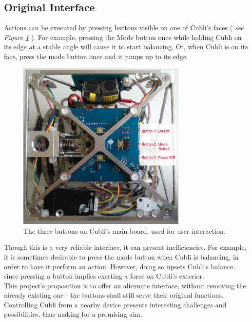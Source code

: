 \subsection{Original Interface}
 
Actions can be executed by pressing buttons visible on one of Cubli's faces ( \textit{see Figure \ref{img:Buttons}} ). For example, pressing the Mode button once while holding Cubli on its edge at a stable angle will cause it to start balancing. Or, when Cubli is on its face, press the mode button once and it jumps up to its edge.\\

\begin{figure}[ht]
   \centering
   \includegraphics[width=0.75\textwidth]{img/Buttons.jpg}
   \caption{The three buttons on Cubli's main board, used for user interaction.}
   \label{img:Buttons}
\end{figure}

Though this is a very reliable interface, it can present inefficiencies. For example, it is sometimes desirable to press the mode button when Cubli is balancing, in order to have it perform an action. However, doing so upsets Cubli's balance, since pressing a button implies exerting a force on Cubli's exterior.\\

This project's proposition is to offer an alternate interface, without removing the already existing one - the buttons shall still serve their original functions. Controlling Cubli from a nearby device presents interesting challenges and possibilities, thus making for a promising aim.

